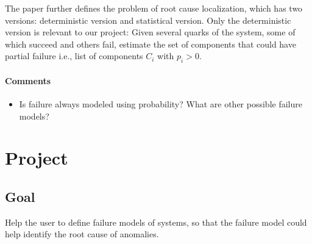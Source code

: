\documentclass{article}
\begin{document}
The paper further defines the problem of root cause localization, which has two
versions: deterministic version and statistical version. Only the deterministic
version is relevant to our project: Given several quarks of the system, some of
which succeed and others fail, estimate the set of components that could have partial
failure i.e., list of components $C_i$ with $p_i > 0$.

\paragraph{Comments}

\begin{itemize}
\item Is failure always modeled using probability? What are other possible
  failure models?
\end{itemize}

\section{Project}
\label{sec:project}

\subsection{Goal}
\label{sec:proj:goal}
Help the user to define failure models of systems, so that the failure model
could help identify the root cause of anomalies.

{}

\end{document}
